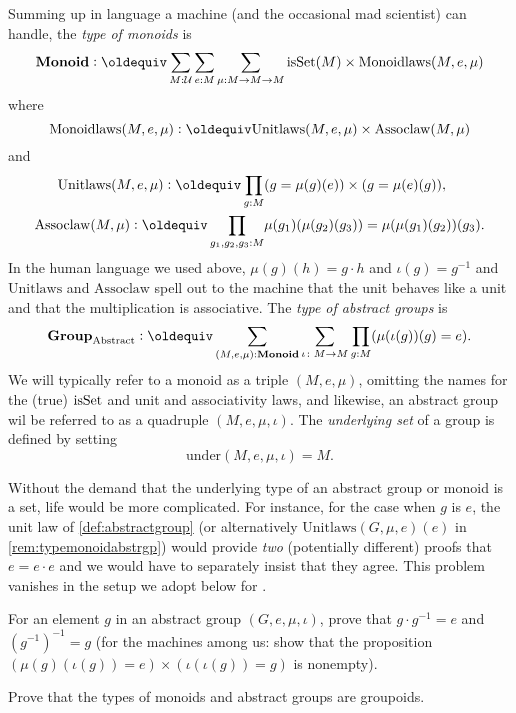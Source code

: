     \begin{remark}\label{rem:typemonoidabstrgp}
        Summing up in language a machine (and the occasional mad scientist) can handle, the \emph{type of monoids} is
$$\typemonoid\defequi \sum_{M:\mathcal U}\sum_{e:M}\sum_{\mu{}:M\to M\to M}
\isset{(M)}\times\mathrm{Monoidlaws}(M,e,\mu)
$$
where
$$\mathrm{Monoidlaws}(M,e,\mu)\defequi\mathrm{Unitlaws}(M,e,\mu)\times\mathrm{Assoclaw}(M,\mu{})$$and
\begin{align*}
  \mathrm{Unitlaws}(M,e,\mu)\defequi\prod_{g:M}
&(g=\mu{}(g)(e))\times(g=\mu{}(e)(g)),\\
\mathrm{Assoclaw}(M,\mu{})\defequi\prod_{g_1,g_2,g_3:M}&\mu{}(g_1)(\mu{}(g_2)(g_3))=\mu{}(\mu{}(g_1)(g_2))(g_3).
\end{align*}
In the human language we used above, $\mu(g)(h)=g\cdot h$ and $\iota(g)=g^{-1}$ and $\mathrm{Unitlaws}$ and $\mathrm{Assoclaw}$ spell out to the machine that the unit behaves like a unit and that the multiplication is associative.
The
\emph{type of abstract groups} is
$$\typeabsgp\defequi
\sum_{(M,e,\mu):\typemonoid}\sum_{\iota\colon M\to M}\prod_{g:M}(\mu{}(\iota{}(g))(g)=e).$$
We will typically refer to a monoid as a triple $(M,e,\mu)$, omitting the names for the (true) $\mathrm{isSet}$ and unit and associativity laws, and likewise, an abstract group wil be referred to as a quadruple $(M,e,\mu,\iota)$.  The \emph{underlying set} of a group is defined by setting 
$$\mathrm{under}(M,e,\mu,\iota)=M.$$
\end{remark}
  \begin{remark}
Without the demand that the underlying type of an abstract group or monoid is a set, life would be more complicated.  For instance, for the case when $g$ is $e$, the unit law of \cref{def:abstractgroup} (or alternatively $\mathrm{Unitlaws}(G,\mu{},e)(e)$ in \cref{rem:typemonoidabstrgp}) would provide \emph{two} (potentially different) proofs that $e=e\cdot e$ and we would have to separately insist that they agree.  This problem vanishes in the setup we adopt below for \inftygps.
  \end{remark}

  \begin{xca}
    For an element $g$ in an abstract group $(G,e,\mu,\iota)$, prove that $g\cdot g^{-1}=e$ and $(g^{-1})^{-1}=g$ (for the machines among us: show that the proposition
$
(\mu{}(g)(\iota{}(g))=e)\times
(\iota{}(\iota{}(g))=g)$ is nonempty).
  \end{xca}
  \begin{xca}\label{xca:typegroupisgroupoid}
    Prove that the types of monoids and abstract groups are groupoids.
  \end{xca}



